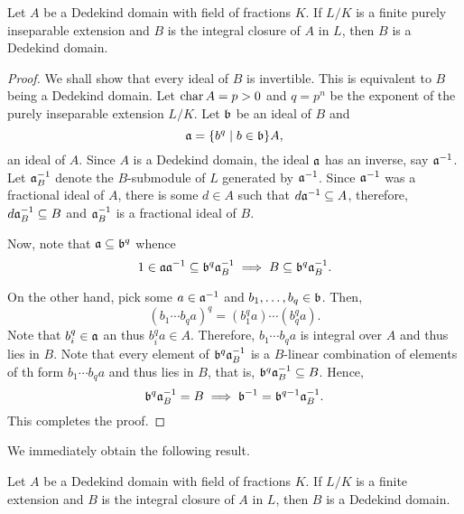 \begin{theorem}
    Let $A$ be a Dedekind domain with field of fractions $K$. If $L/K$ is a finite purely inseparable extension and $B$ is the integral closure of $A$ in $L$, then $B$ is a Dedekind domain.
\end{theorem}
\begin{proof}
    We shall show that every ideal of $B$ is invertible. This is equivalent to $B$ being a Dedekind domain. Let $\operatorname{char} A = p > 0$ and $q = p^n$ be the exponent of the purely inseparable extension $L/K$. Let $\mathfrak b$ be an ideal of $B$ and 
    \begin{equation*}
        \mathfrak a = \{b^q\mid b\in\mathfrak b\}A,
    \end{equation*}
    an ideal of $A$. Since $A$ is a Dedekind domain, the ideal $\mathfrak a$ has an inverse, say $\mathfrak a^{-1}$. Let $\mathfrak a^{-1}_B$ denote the $B$-submodule of $L$ generated by $\mathfrak a^{-1}$. Since $\mathfrak a^{-1}$ was a fractional ideal of $A$, there is some $d\in A$ such that $d\mathfrak a^{-1}\subseteq A$, therefore, $d\mathfrak a^{-1}_B\subseteq B$ and $\mathfrak a^{-1}_B$ is a fractional ideal of $B$.

    Now, note that $\mathfrak a\subseteq\mathfrak b^q$ whence 
    \begin{equation*}
        1\in\mathfrak a\mathfrak a^{-1}\subseteq\mathfrak b^q\mathfrak a_B^{-1}\implies B\subseteq\mathfrak b^q\mathfrak a^{-1}_B.
    \end{equation*}
    
    On the other hand, pick some $a\in\mathfrak a^{-1}$ and $b_1,\dots,b_q\in\mathfrak b$. Then, 
    \begin{equation*}
        (b_1\cdots b_q a)^q = (b_1^qa)\cdots(b_q^qa).
    \end{equation*}
    Note that $b_i^q\in\mathfrak a$ an thus $b_i^qa\in A$. Therefore, $b_1\cdots b_qa$ is integral over $A$ and thus lies in $B$. Note that every element of $\mathfrak b^q\mathfrak a_B^{-1}$ is a $B$-linear combination of elements of th form $b_1\cdots b_qa$ and thus lies in $B$, that is, $\mathfrak b^q\mathfrak a_B^{-1}\subseteq B$. Hence, 
    \begin{equation*}
        \mathfrak b^q\mathfrak a^{-1}_B = B\implies\mathfrak b^{-1} = \mathfrak b^{q - 1}\mathfrak a^{-1}_B.
    \end{equation*}
    This completes the proof.
\end{proof}

We immediately obtain the following result.

\begin{corollary}
    Let $A$ be a Dedekind domain with field of fractions $K$. If $L/K$ is a finite extension and $B$ is the integral closure of $A$ in $L$, then $B$ is a Dedekind domain.
\end{corollary}